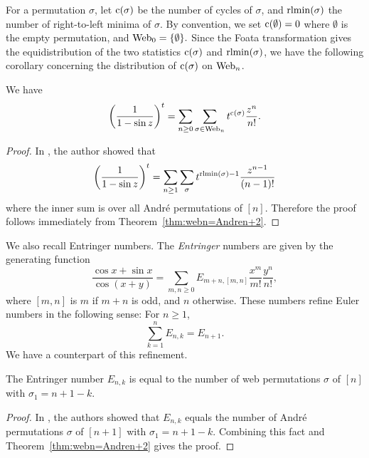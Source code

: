 For a permutation \( \sigma \), let \( \operatorname{c}(\sigma) \) be the number of cycles of
\( \sigma \), and \( \operatorname{rlmin}(\sigma) \) the number of right-to-left minima of
\( \sigma \).
By convention, we set \( \operatorname{c}(\emptyset) = 0 \) where \( \emptyset \) is
the empty permutation, and \( \operatorname{Web}_0=\{\emptyset\}. \)
Since the Foata transformation gives the equidistribution of the two statistics
\( \operatorname{c}(\sigma) \) and \( \operatorname{rlmin}(\sigma) \), we have the following corollary
concerning the distribution of \( \operatorname{c}(\sigma) \) on \( \operatorname{Web}_n \).
\begin{cor} 
  We have
  \begin{align*}
    \left( \frac{1}{1-\sin z} \right)^t =
      \sum_{n\ge 0} \sum_{\sigma\in \operatorname{Web}_n} t^{\operatorname{c}(\sigma)} \frac{z^{n}}{n!}.
  \end{align*}
\end{cor}
\begin{proof} 
  In \cite[Proposition~1]{Dis13}, the author showed that 
  \begin{align*}
    \left( \frac{1}{1-\sin z} \right)^t = \sum_{n\ge 1}\sum_{\sigma}
    t^{\operatorname{rlmin}(\sigma)-1} \frac{z^{n-1}}{(n-1)! }
  \end{align*}
  where the inner sum is over all Andr\'e permutations of \( [n] \).
  Therefore the proof follows immediately from Theorem~\ref{thm:webn=Andren+2}.
\end{proof}

We also recall Entringer numbers.
The \emph{Entringer} numbers are given by
the generating function
\[
  \frac{\cos x + \sin x}{\cos (x+y)} = \sum_{m,n \ge 0} E_{m+n,[m,n]} \frac{x^m}{m!} \frac{y^n}{n!},
\]
where \( [m,n] \) is \( m \) if \( m+n \) is odd, and \( n \) otherwise.
These numbers refine Euler numbers in the following sense: For \( n\ge 1 \),
\[
  \sum_{k=1}^n E_{n,k} = E_{n+1}.
\]
We have a counterpart of this refinement.
\begin{cor} 
  The Entringer number \( E_{n,k} \) is equal to the number of web permutations \( \sigma \) of \( [n] \) with \( \sigma_1 = n+1-k \).
\end{cor}
\begin{proof} 
  In \cite[Theorem~1.1]{FH16}, the authors showed that \( E_{n,k} \) equals the
  number of Andr\'e permutations \( \sigma \) of \( [n+1] \) with
  \( \sigma_1 = n+1-k \).
  Combining this fact and Theorem~\ref{thm:webn=Andren+2} gives the proof.
\end{proof}


